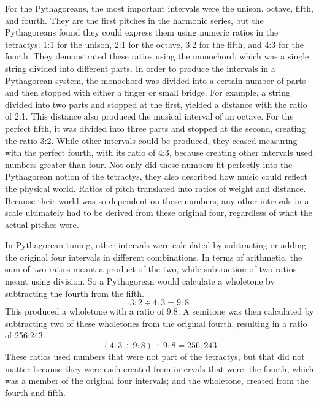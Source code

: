 For the Pythagoreans, the most important intervals were the unison, octave, fifth, and fourth. They are the first
pitches in the harmonic series, but the Pythagoreans found they could express them using numeric ratios in the
tetractys: 1:1 for the unison, 2:1 for the octave, 3:2 for the fifth, and 4:3 for the fourth. They demonstrated these
ratios using the monochord, which was a single string divided into different parts. In order to produce the intervals
in a Pythagorean system, the monochord was divided into a certain number of parts and then stopped with either a finger
or small bridge. For example, a string divided into two parts and stopped at the first, yielded a distance with the
ratio of 2:1. This distance also produced the musical interval of an octave. For the perfect fifth, it was divided into
three parts and stopped at the second, creating the ratio 3:2. While other intervals could be produced, they ceased
measuring with the perfect fourth, with its ratio of 4:3, because creating other intervals used numbers greater than
four. Not only did these numbers fit perfectly into the Pythagorean notion of the tetractys, they also described how
music could reflect the physical world. Ratios of pitch translated into ratios of weight and distance. Because their
world was so dependent on these numbers, any other intervals in a scale ultimately had to be derived from these original
four, regardless of what the actual pitches were.\autocite[274]{CN:1}

In Pythagorean tuning, other intervals were calculated by subtracting or adding the
original four intervals in different combinations. In terms of arithmetic, the sum of two
ratios meant a product of the two, while subtraction of two ratios meant using division.
So a Pythagorean would calculate a wholetone by subtracting the fourth from the fifth.
\begin{equation}
3:2 \div 4:3 = 9:8
\end{equation}
This produced a wholetone with a ratio of 9:8. A semitone was then calculated by
subtracting two of these wholetones from the original fourth, resulting in a ratio
of 256:243. 
\begin{equation}
  (4:3 \div 9:8) \div 9:8 = 256:243
\end{equation}
These ratios used numbers that were not part of the tetractys,
but that did not matter because they were each created from intervals that
were: the fourth, which was a member of the original four intervals; and the
wholetone, created from the fourth and fifth.

